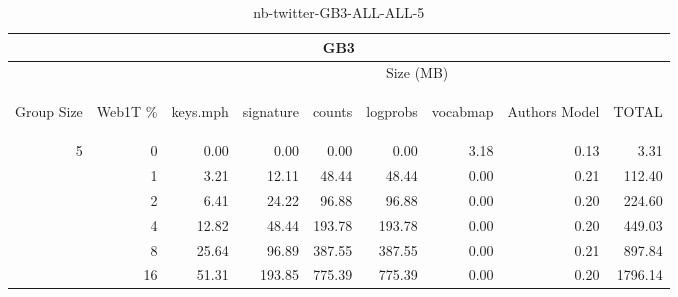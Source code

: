 \begin{center}
\begin{table}[htbp] 
 \begin{center}
\begin{tabular}{ | r | r | r | r | r | r | r | r | r |}
\hline
\multicolumn{9}{|c|}{GB3}\\
\hline
 & & \multicolumn{7}{|c|}{Size (MB)}\\ \cline{3-9}
\begin{sideways}Group Size\end{sideways} & \begin{sideways}Web1T \% \end{sideways} & \begin{sideways}keys.mph\end{sideways} & \begin{sideways}signature\end{sideways} & \begin{sideways}counts\end{sideways} & \begin{sideways}logprobs\end{sideways} & \begin{sideways}vocabmap\end{sideways} & \begin{sideways}Authors Model \end{sideways} & \begin{sideways}TOTAL\end{sideways}\\
\hline
\multirow{5}{*}{5}
 & 0 & 0.00 & 0.00 & 0.00 & 0.00 & 3.18 & 0.13 & 3.31\\ \cline{2-9}
 & 1 & 3.21 & 12.11 & 48.44 & 48.44 & 0.00 & 0.21 & 112.40\\ \cline{2-9}
 & 2 & 6.41 & 24.22 & 96.88 & 96.88 & 0.00 & 0.20 & 224.60\\ \cline{2-9}
 & 4 & 12.82 & 48.44 & 193.78 & 193.78 & 0.00 & 0.20 & 449.03\\ \cline{2-9}
 & 8 & 25.64 & 96.89 & 387.55 & 387.55 & 0.00 & 0.21 & 897.84\\ \cline{2-9}
 & 16 & 51.31 & 193.85 & 775.39 & 775.39 & 0.00 & 0.20 & 1796.14\\ \cline{2-9}
\hline
\end{tabular}
\caption{nb-twitter-GB3-ALL-ALL-5}
\label{table:nb-twitter-GB3-ALL-ALL-5}
\end{center}
 \end{table}
\end{center}

